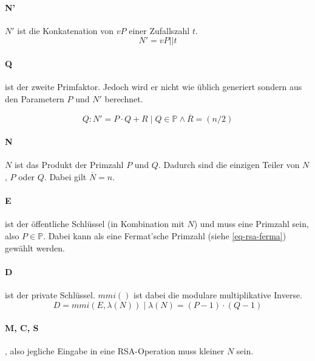             \paragraph{N'} $N'$ ist die Konkatenation von $vP$ einer Zufallszahl $t$.
            \begin{equation}
                N' = vP || t
            \end{equation}

            \paragraph{Q} ist der zweite Primfaktor. Jedoch wird er nicht wie üblich generiert sondern aus den Parametern $P$ und $N'$ berechnet.
            
            \begin{equation}
                Q : N' = P \cdot Q + R \mid Q \in \mathbb{P} \wedge \overline{R} = (n/2)
            \end{equation}

            \paragraph{N} $N$ ist das Produkt der Primzahl $P$ und $Q$. Dadurch sind die einzigen Teiler von $N$, $P$ oder $Q$. Dabei gilt $\overline{N} = n$.

            \paragraph{E} ist der öffentliche Schlüssel (in Kombination mit $N$) und muss eine Primzahl sein, also $P \in \mathbb{P}$. Dabei kann als eine Fermat'sche Primzahl (siehe \ref{eq-rsa-ferma}) gewählt werden.

            \paragraph{D} ist der private Schlüssel. $mmi()$ ist dabei die modulare multiplikative Inverse.
            \begin{equation}
                D = mmi(E, \lambda(N)) \mid \lambda(N) = (P-1)\cdot(Q-1)
            \end{equation}

            \paragraph{M, C, S}, also jegliche Eingabe in eine \ac{RSA}-Operation muss kleiner $N$ sein.

